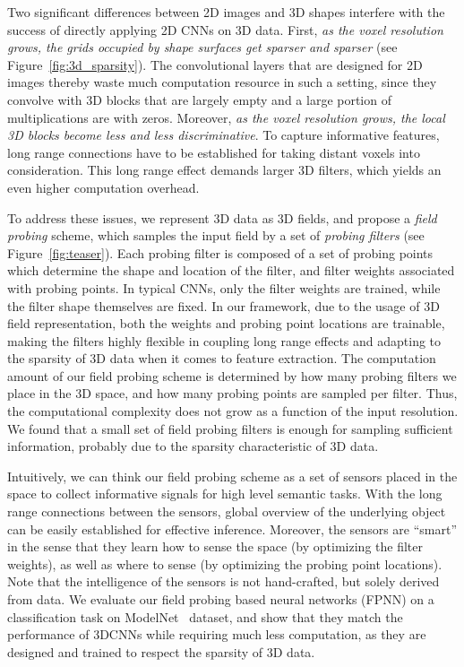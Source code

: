 \documentclass{article}
\begin{document}
Two significant differences between 2D images and 3D shapes interfere with the success of directly applying 2D CNNs on 3D data. First, \emph{as the voxel resolution grows, the grids occupied by shape surfaces get sparser and sparser} (see Figure~\ref{fig:3d_sparsity}). The convolutional layers that are designed for 2D images thereby waste much computation resource in such a setting, since they convolve with 3D blocks that are largely empty and a large portion of multiplications are with zeros. Moreover, \emph{as the voxel resolution grows, the local 3D blocks become less and less discriminative}. To capture informative features, long range connections have to be established for taking distant voxels into consideration. This long range effect demands larger 3D filters, which yields an even higher computation overhead.

To address these issues, we represent 3D data as 3D fields, and propose a \emph{field probing} scheme, which samples the input field by a set of {\em probing filters} (see Figure~\ref{fig:teaser}). Each probing filter is composed of a set of probing points which determine the shape and location of the filter, and filter weights associated with probing points. In typical CNNs, only the filter weights are trained, while the filter shape themselves are fixed. In our framework, due to the usage of 3D field representation, both the weights and probing point locations are trainable, making the filters highly flexible in coupling long range effects and adapting to the sparsity of 3D data when it comes to feature extraction. The computation amount of our field probing scheme is determined by how many probing filters we place in the 3D space, and how many probing points are sampled per filter. Thus, the computational complexity does not grow as a function of the input resolution. We found that a small set of field probing filters is enough for sampling sufficient information, probably due to the sparsity characteristic of 3D data.

Intuitively, we can think our field probing scheme as a set of sensors placed in the space to collect informative signals for high level semantic tasks. With the long range connections between the sensors, global overview of the underlying object can be easily established for effective inference. Moreover, the sensors are ``smart'' in the sense that they learn how to sense the space (by optimizing the filter weights), as well as where to sense (by optimizing the probing point locations). Note that the intelligence of the sensors is not hand-crafted, but solely derived from data. We evaluate our field probing based neural networks (FPNN) on a classification task on ModelNet~\cite{WU_CVPR15_3D} dataset, and show that they match the performance of 3DCNNs while requiring much less computation, as they are designed and trained to respect the sparsity of 3D data.
 \vspace{-0.3cm}
\end{document}
